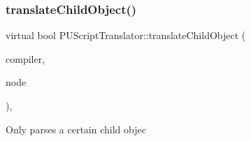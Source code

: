 \mbox{\label{classPUScriptTranslator_ab587d01348ae3e678cb700c719b2b113}} 
\subsubsection{\texorpdfstring{translate\+Child\+Object()}{translateChildObject()}\hspace{0.1cm}{\footnotesize\ttfamily [2/2]}}
{\footnotesize\ttfamily virtual bool P\+U\+Script\+Translator\+::translate\+Child\+Object (\begin{DoxyParamCaption}\item[{\hyperlink{classPUScriptCompiler}{P\+U\+Script\+Compiler} $\ast$}]{compiler,  }\item[{\hyperlink{classPUAbstractNode}{P\+U\+Abstract\+Node} $\ast$}]{node }\end{DoxyParamCaption})\hspace{0.3cm}{\ttfamily [inline]}, {\ttfamily [virtual]}}

Only parses a certain child objec 

